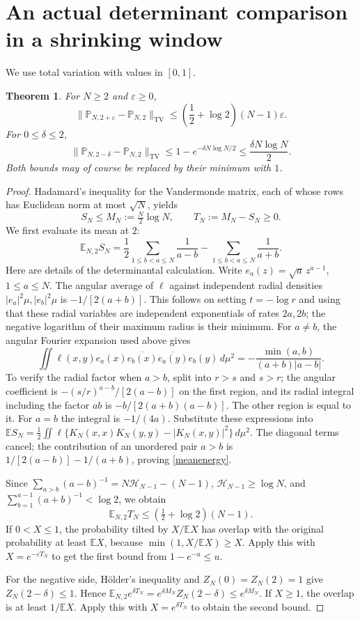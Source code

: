 \documentclass[11pt]{article}
\newtheorem{theorem}{Theorem}[section]
\theoremstyle{remark}\newtheorem{remark}[theorem]{Remark}
\newcommand{\E}{\mathbb E}
\newcommand{\Pp}{\mathbb P}
\newcommand{\TV}{\mathrm{TV}}
\begin{document}
\section{An actual determinant comparison in a shrinking window}
We use total variation with values in $[0,1]$.
\begin{theorem}\label{tv}
For $N\ge2$ and $\varepsilon\ge0$,
\[
 \|\Pp_{N,2+\varepsilon}-\Pp_{N,2}\|_{\TV}
 \le\left(\frac12+\log2\right)(N-1)\varepsilon.
\]
For $0\le\delta\le2$,
\[
 \|\Pp_{N,2-\delta}-\Pp_{N,2}\|_{\TV}
 \le1-e^{-\delta N\log N/2}\le\frac{\delta N\log N}{2}.
\]
Both bounds may of course be replaced by their minimum with $1$.
\end{theorem}
\begin{proof}
Hadamard's inequality for the Vandermonde matrix, each of whose rows has
Euclidean norm at most $\sqrt N$, yields
\[
 S_N\le M_N:=\tfrac N2\log N,\qquad T_N:=M_N-S_N\ge0.
\]
We first evaluate its mean at $2$:
\begin{equation}\label{meanenergy}
 \E_{N,2}S_N=\frac12\sum_{1\le b<a\le N}\frac1{a-b}
                  -\sum_{1\le b<a\le N}\frac1{a+b}.
\end{equation}
Here are details of the determinantal calculation. Write
$e_a(z)=\sqrt a\,z^{a-1}$, $1\le a\le N$. The angular average of
$\ell$ against independent radial densities $|e_a|^2\mu,|e_b|^2\mu$ is
$-1/[2(a+b)]$. This follows on setting $t=-\log r$ and using that these
radial variables are independent exponentials of rates $2a,2b$; the
negative logarithm of their maximum radius is their minimum.
For $a\ne b$, the angular Fourier expansion used above gives
\[
 \iint\ell(x,y)e_a(x)\overline{e_b(x)}
       \overline{e_a(y)}e_b(y)\,d\mu^2
       =-\frac{\min(a,b)}{(a+b)|a-b|}.
\]
To verify the radial factor when $a>b$, split into $r>s$ and $s>r$;
the angular coefficient is $-(s/r)^{a-b}/[2(a-b)]$ on the first region,
and its radial integral including the factor $ab$ is
$-b/[2(a+b)(a-b)]$. The other region is equal to it. For $a=b$ the
integral is $-1/(4a)$. Substitute these expressions into
$\E S_N=\frac12\iint\ell\{K_N(x,x)K_N(y,y)-|K_N(x,y)|^2\}\,d\mu^2$.
The diagonal terms cancel; the contribution of an unordered pair $a>b$
is $1/[2(a-b)]-1/(a+b)$, proving \eqref{meanenergy}.

Since $\sum_{a>b}(a-b)^{-1}=N\mathcal H_{N-1}-(N-1)$,
$\mathcal H_{N-1}\ge\log N$, and
$\sum_{b=1}^{a-1}(a+b)^{-1}<\log2$, we obtain
\[
 \E_{N,2}T_N\le\left(\tfrac12+\log2\right)(N-1).
\]
If $0<X\le1$, the probability tilted by $X/\E X$ has overlap with the
original probability at least $\E X$, because
$\min(1,X/\E X)\ge X$. Apply this with $X=e^{-\varepsilon T_N}$ to get
the first bound from $1-e^{-u}\le u$.

For the negative side, H\"older's inequality and $Z_N(0)=Z_N(2)=1$ give
$Z_N(2-\delta)\le1$. Hence
$\E_{N,2}e^{\delta T_N}=e^{\delta M_N}Z_N(2-\delta)\le e^{\delta M_N}$.
If $X\ge1$, the overlap is at least $1/\E X$. Apply this with
$X=e^{\delta T_N}$ to obtain the second bound.
\end{proof}
\end{document}
